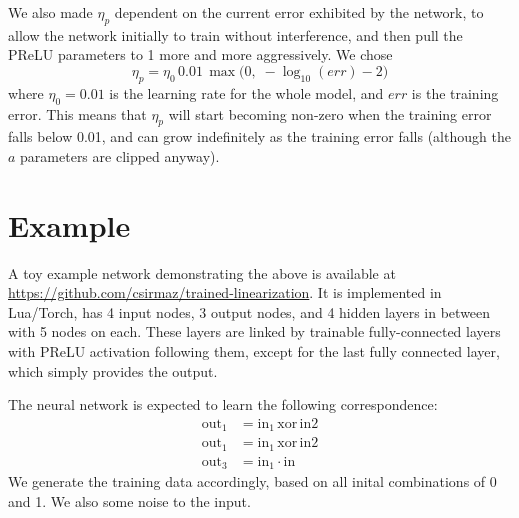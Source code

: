 \documentclass{article}[12pt]
\begin{document}
We also made $\eta_p$ dependent on the current error exhibited by the network,
to allow the network initially to train without interference, and then
pull the PReLU parameters to 1 more and more aggressively. We chose
\[ \eta_p = \eta_0\,0.01\,\max\big(0,\; -\log_{10}(err)-2\big) \]
where $\eta_0=0.01$ is the learning rate for the whole model, and $err$ is the training error.
This means that $\eta_p$ will start becoming non-zero when the training error
falls below 0.01, and can grow indefinitely as the training error falls
(although the $a$ parameters are clipped anyway).

\section{Example}

A toy example network demonstrating the above is available at
\url{https://github.com/csirmaz/trained-linearization}.
It is implemented in Lua/Torch, has 4 input nodes, 3 output nodes, and
4 hidden layers in between with 5 nodes on each.
These layers are linked by trainable fully-connected layers
with PReLU activation following them, except for the last fully connected layer,
which simply provides the output.

The neural network is expected to learn the following correspondence:
\begin{align}
\mathrm{out}_1 &= \mathrm{in}_1 \,\mathrm{xor}\, \mathrm{in}2 \\
\mathrm{out}_1 &= \mathrm{in}_1 \,\mathrm{xor}\, \mathrm{in}2 \\
\mathrm{out}_3 &= \mathrm{in}_1 \cdot \mathrm{in}
\end{align}
We generate the training data accordingly, based on all inital combinations of 0 and 1. We also some noise to the input.
\end{document}
